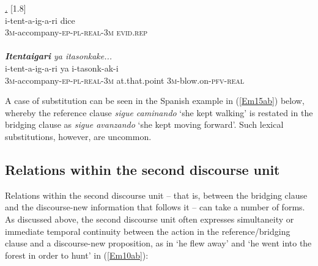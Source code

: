 \documentclass[output=paper]{LSP/langsci}
\begin{document}
\begin{exe}
\ex \label{Em09ab}
\begin{xlist}
\ex \label{Emex:09a}
\glt \textit{ \underline{.}} [1.8]\\
\gll i-tent-a-ig-a-ri dice \\
 \textsc{3m-}accompany\textsc{-ep-pl-real-3m} \textsc{evid.rep}\\
\glt {}\\
\ex \label{Emex:09b}
\glt \textit{\textbf{Itentaigari} ya itasonkake...}\\
\gll i-tent-a-ig-a-ri ya i-tasonk-ak-i\\     	      
   \textsc{3m-}accompany\textsc{-ep-pl-real-3m} at.that.point \textsc{3m-}blow.on\textsc{-pfv-real}\\
\glt {}
\end{xlist}
\end{exe}


A case of substitution can be seen in the Spanish example in (\ref{Em15ab}) below, whereby the reference clause \textit{sigue caminando} `she kept walking' is restated in the bridging clause as \textit{sigue avanzando} `she kept moving forward'. Such lexical substitutions, however, are uncommon. 
%
\subsection{Relations within the second discourse unit}
\label{Em2ndunit}
Relations within the second discourse unit – that is, between the bridging clause and the discourse-new information that follows it – can take a number of forms. As discussed above, the second discourse unit often expresses simultaneity or immediate temporal continuity between the action in the reference/bridging clause and a discourse-new proposition, as in `he flew away' and `he went into the forest in order to hunt' in (\ref{Em10ab}): 
\end{document}
